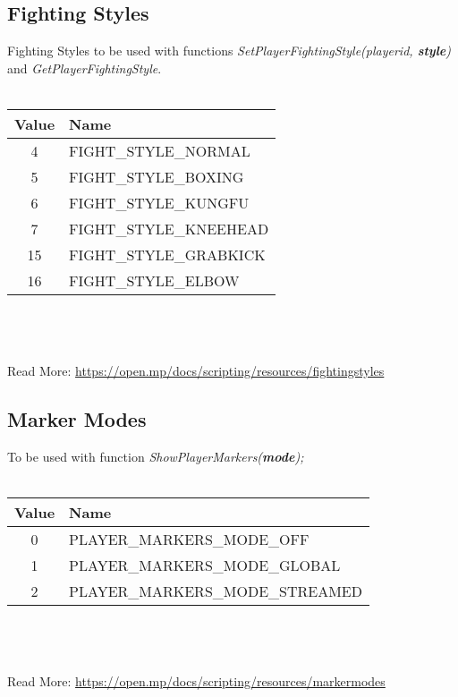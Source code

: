 \documentclass{article}
\begin{document}
\subsection{Fighting Styles}
Fighting Styles to be used with functions \textit{SetPlayerFightingStyle(playerid, \textbf{style})} and \textit{GetPlayerFightingStyle}.
\\
\\
\begin{tabular}{ |c|l| } 
\hline
Value & Name \\
\hline
4 & FIGHT\_STYLE\_NORMAL \\
5 & FIGHT\_STYLE\_BOXING \\
6 & FIGHT\_STYLE\_KUNGFU \\
7 & FIGHT\_STYLE\_KNEEHEAD \\
15 & FIGHT\_STYLE\_GRABKICK \\
16 & FIGHT\_STYLE\_ELBOW \\
\hline
\end{tabular}
\\\\
\\Read More: \url{https://open.mp/docs/scripting/resources/fightingstyles}


\newpage
\subsection{Marker Modes}
To be used with function \textit{ShowPlayerMarkers(\textbf{mode});}
\\
\\
\begin{tabular}{ |c|l| } 
\hline
Value & Name \\
\hline
0 & PLAYER\_MARKERS\_MODE\_OFF \\ 
1 & PLAYER\_MARKERS\_MODE\_GLOBAL \\ 
2 & PLAYER\_MARKERS\_MODE\_STREAMED \\
\hline
\end{tabular}
\\\\
\\Read More: \url{https://open.mp/docs/scripting/resources/markermodes}
\end{document}

